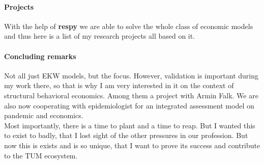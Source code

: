 \paragraph{Projects} With the help of \textbf{respy} we are able to solve the whole class of economic models and thus here is a list of my research projects all based on it.

\paragraph{Concluding remarks} Not all just EKW models, but the focus. However, validation is important during my work there, so that is why I am very interested in it on the context of structural behavioral economics. Among them a project with Armin Falk. We are also now cooperating with epidemiologist for an integrated assessment model on pandemic and economics.\\

\noindent Most importantly, there is a time to plant and a time to reap. But I wanted this to exist to badly, that I lost sight of the other pressures in our profession. But now this is exists and is so unique, that I want to prove its success and contribute to the TUM ecosystem.
